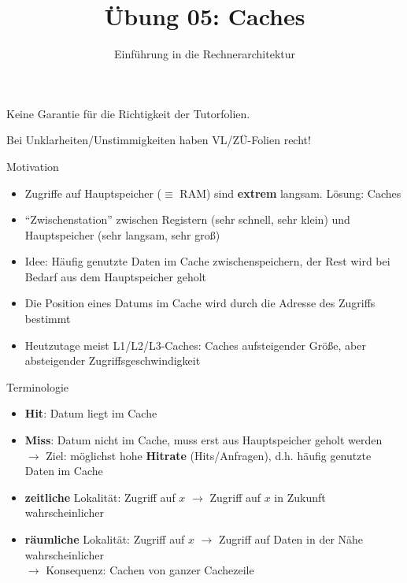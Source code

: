 

\title{Übung 05: Caches}
\subtitle{Einführung in die Rechnerarchitektur}
\date{}



\maketitle

\begin{frame}[c, fragile]{}{}
	\begin{center}
		\LARGE  Keine Garantie für die Richtigkeit der Tutorfolien.

		\Large Bei Unklarheiten/Unstimmigkeiten haben VL/ZÜ-Folien recht!
	\end{center}
\end{frame}

\begin{frame}[fragile, c]{Motivation}{}
	\begin{itemize}
		\item Zugriffe auf Hauptspeicher ($\equiv$ RAM) sind \textbf{extrem} langsam. Lösung: Caches
		\item \enquote{Zwischenstation} zwischen Registern (sehr schnell, sehr klein) und Hauptspeicher (sehr langsam, sehr groß)
		\item Idee: Häufig genutzte Daten im Cache zwischenspeichern, der Rest wird bei Bedarf aus dem Hauptspeicher geholt
		\item Die Position eines Datums im Cache wird durch die Adresse des Zugriffs bestimmt
		\item Heutzutage meist L1/L2/L3-Caches: Caches aufsteigender Größe, aber absteigender Zugriffsgeschwindigkeit
	\end{itemize}
\end{frame}


\begin{frame}[t]{Terminologie}
	\vspace*{1cm}
	\begin{itemize}
		\item \textbf{Hit}: Datum liegt im Cache
		\item \textbf{Miss}: Datum nicht im Cache, muss erst aus Hauptspeicher geholt werden\\$\rightarrow$ Ziel: möglichst hohe \textbf{Hitrate} (Hits/Anfragen), d.h. häufig genutzte Daten im Cache

	\end{itemize}
	\vfill{}
	\pause
	\begin{itemize}
		\item \textbf{zeitliche} Lokalität: Zugriff auf $x$ $\rightarrow$ Zugriff auf $x$ in Zukunft wahrscheinlicher
		\item \textbf{räumliche} Lokalität: Zugriff auf $x$ $\rightarrow$ Zugriff auf Daten in der Nähe wahrscheinlicher\\$\rightarrow$ Konsequenz: Cachen von ganzer Cachezeile
	\end{itemize}
\end{frame}

